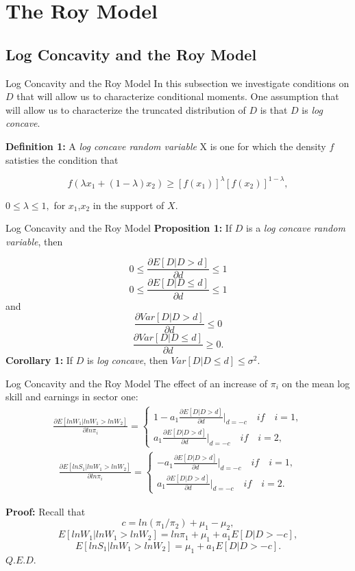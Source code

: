 \documentclass{beamer}
\begin{document}
\section{The Roy Model}
\subsection{Log Concavity and the Roy Model}
\begin{frame}{Log Concavity and the Roy Model}
In this subsection we investigate conditions on $D$ that will allow us to characterize conditional moments. One assumption that will allow us to characterize the truncated distribution of $D$ is that $D$ is \textit{log concave}.
\pause
\bigskip

\textbf{Definition 1:} A \textit{log concave random variable} X is one for which the density $f$ satisties the condition that 

$$f(\lambda x_1+(1-\lambda)x_2)\geq [f(x_1)]^\lambda[f(x_2)]^{1-\lambda},$$

$0\leq\lambda\leq1,$ for $x_1$,$x_2$ in the support of $X$.
\end{frame}
\begin{frame}{Log Concavity and the Roy Model}
\textbf{Proposition 1:} If $D$ is a \textit{log concave random variable}, then
	
	$$0\leq \frac{\partial E[D|D>d]}{\partial d}\leq 1 $$
	$$0\leq \frac{\partial E[D|D\leq d]}{\partial d}\leq 1 $$
and
	$$\frac{\partial Var[D|D>d]}{\partial d}\leq 0 $$
	$$\frac{\partial Var[D|D\leq d]}{\partial d}\geq 0. $$
\textbf{Corollary 1:} If $D$ is \textit{log concave}, then $Var[D|D\leq d]\leq \sigma^2$.
\end{frame}
\begin{frame}{Log Concavity and the Roy Model}
The effect of an increase of $\pi_i$ on the mean log skill and earnings in sector one:
\begin{align}\nonumber
	\frac{\partial E[lnW_1|lnW_1>lnW_2]}{\partial ln\pi_i} =\left\{
	\begin{aligned}
		1-a_1\frac{\partial E[D|D>d]}{\partial d}\left|\right._{d=-c} \quad if \quad i=1,\\
		a_1\frac{\partial E[D|D>d]}{\partial d}\left|\right._{d=-c} \quad if \quad i=2,
	\end{aligned}
	\right.
\end{align}
\begin{align}\nonumber
	\frac{\partial E[lnS_1|lnW_1>lnW_2]}{\partial ln\pi_i} =\left\{
	\begin{aligned}
	-a_1\frac{\partial E[D|D>d]}{\partial d}\left|\right._{d=-c} \quad if \quad i=1,\\
	a_1\frac{\partial E[D|D>d]}{\partial d}\left|\right._{d=-c} \quad if \quad i=2.
	\end{aligned}
	\right.
\end{align}

\textbf{Proof:} Recall that
$$c=ln(\pi_1/\pi_2)+\mu_1-\mu_2,$$
$$E[lnW_1|lnW_1>lnW_2]=ln\pi_1+\mu_1+a_1 E[D|D>-c],$$
$$E[lnS_1|lnW_1>lnW_2]=\mu_1+a_1 E[D|D>-c].$$
\hfill $Q.E.D.$
\end{frame}
\end{document}
